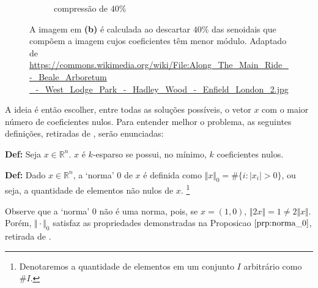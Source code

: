 {\begin{figure}
\begin{center}
\begin{subfigure}[b]{1\textwidth}
        \caption{compressão de $40\%$}
    \end{subfigure}
    \caption[]{A imagem em {\bf (b)} é calculada ao descartar $40\%$ das senoidais que compõem a imagem cujos coeficientes têm menor módulo. Adaptado de \\ \small{\protect\url{https://commons.wikimedia.org/wiki/File:Along_The_Main_Ride_-_Beale_Arboretum}  \\\protect\url{_-_West_Lodge_Park_-_Hadley_Wood_-_Enfield_London_2.jpg}}}
     \label{fig:coeficientes_altos}
\end{center}
\end{figure}
}

A ideia é então escolher, entre todas as soluções possíveis, o vetor $x$ com o maior número de coeficientes nulos. Para entender melhor o problema, as seguintes definições, retiradas de \cite{ddek}, serão enunciadas:

\textbf{Def:} Seja $x \in \mathbb{R}^n$. $x$ é $k$-esparso se possui, no mínimo, $k$ coeficientes nulos.

\textbf{Def:} Dado $x \in \mathbb{R}^n$, a `norma' $0$ de $x$ é definida como
$\Vert x \Vert_{0} = \# \lbrace i : \vert x_i \vert > 0 \rbrace$, ou seja, a quantidade de elementos não nulos de $x$. \footnote{Denotaremos a quantidade de elementos em um conjunto $I$ arbitrário como $\# I$.}

Observe que a `norma' 0 não é uma norma, pois, se $x = (1, 0)$, $\Vert 2x \Vert = 1 \neq 2 \Vert x \Vert$. Porém, $\Vert \cdot \Vert_0$ satisfaz as propriedades demonstradas na Proposicao $\ref{prp:norma_0}$, retirada de \cite{ddek}.

